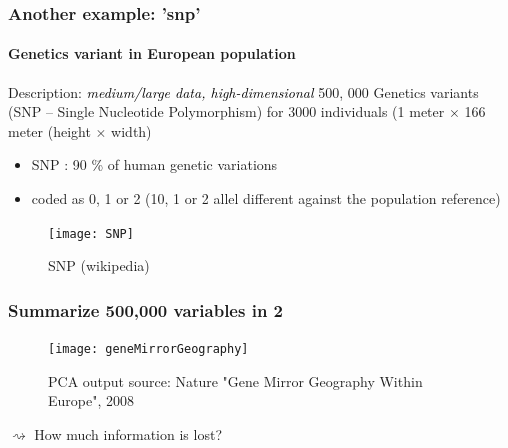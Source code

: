 \begin{frame}[fragile]
  \frametitle{Another example: 'snp'}
  \framesubtitle{Genetics variant in European population}

\begin{block}{Description: \textcolor{black}{\it medium/large data, high-dimensional}}
500, 000 Genetics variants (SNP -- Single Nucleotide Polymorphism) for  3000 individuals
(1 meter $\times$ 166 meter (height $\times$ width)
\end{block}

\begin{multicols}{2}
  \begin{itemize}
  \item SNP : 90 \% of human genetic variations
  \item coded as 0, 1 or 2 (10, 1 or 2 allel different against the population reference)
  \end{itemize}

  \begin{figure}
    \centering
     \texttt{[image: SNP]}   
    \caption{SNP (wikipedia)}
  \end{figure}
\end{multicols}

\end{frame}

\begin{frame}
  \frametitle{Summarize 500,000 variables in 2}

  \begin{figure}
    \centering
      \texttt{[image: geneMirrorGeography]}
    \caption{PCA output {\tiny source: Nature "Gene  Mirror Geography Within  Europe", 2008}}
  \end{figure}

  $\rightsquigarrow$ How much information is lost?

\end{frame}


